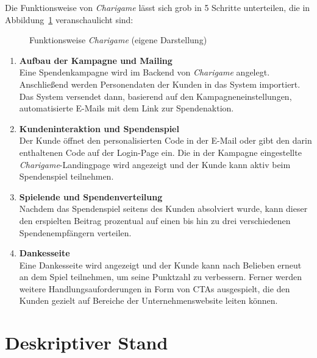 Die Funktionsweise von \textit{Charigame} lässt sich grob in 5 Schritte unterteilen, die in Abbildung~\ref{fig:charigame-funktion} veranschaulicht sind:

\begin{figure}[H]
    \centering
    
    \caption{Funktionsweise \textit{Charigame} (eigene Darstellung)}
    \label{fig:charigame-funktion}
\end{figure}

\begin{enumerate}
    \item \textbf{Aufbau der Kampagne und Mailing}
    \\ Eine Spendenkampagne wird im Backend von \textit{Charigame} angelegt.
    Anschließend werden Personendaten der Kunden in das System importiert.
    Das System versendet dann, basierend auf den Kampagneneinstellungen, automatisierte E-Mails mit dem Link zur Spendenaktion.
    \item \textbf{Kundeninteraktion und Spendenspiel}
    \\ Der Kunde öffnet den personalisierten Code in der E-Mail oder gibt den darin enthaltenen Code auf der Login-Page ein.
    Die in der Kampagne eingestellte \textit{Charigame}-Landingpage wird angezeigt und der Kunde kann aktiv beim Spendenspiel teilnehmen.
    \item \textbf{Spielende und Spendenverteilung}
    \\ Nachdem das Spendenspiel seitens des Kunden absolviert wurde, kann dieser den erspielten Beitrag prozentual auf einen bis hin zu drei verschiedenen Spendenempfängern verteilen.
    \item \textbf{Dankesseite}
    \\ Eine Dankesseite wird angezeigt und der Kunde kann nach Belieben erneut an dem Spiel teilnehmen, um seine Punktzahl zu verbessern.
    Ferner werden weitere Handlungsauforderungen in Form von CTAs ausgespielt, die den Kunden gezielt auf Bereiche der Unternehmenswebsite leiten können.
\end{enumerate}

\section{Deskriptiver Stand}
